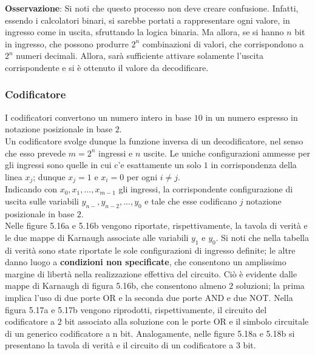 \documentclass[a4paper]{extarticle}
\begin{document}
\vspace{1em}
\noindent
\textbf{Osservazione}: Si noti che questo processo non deve creare confusione. Infatti, essendo i calcolatori binari, si sarebbe portati a rappresentare ogni valore, in ingresso come in uscita, sfruttando la logica binaria. Ma allora, se si hanno \(n\) bit in ingresso, che possono produrre \(2^n\) combinazioni di valori, che corrispondono a \(2^n\) numeri decimali. Allora, sarà sufficiente attivare solamente l'uscita corrispondente e si è ottenuto il valore da decodificare.

\subsubsection{Codificatore}
I codificatori convertono un numero intero in base \(10\) in un numero espresso in notazione posizionale in base \(2\).\\
Un codificatore svolge dunque la funzione inversa di un decodificatore, nel senso che esso prevede \(m = 2^n\) ingressi e \(n\) uscite. Le uniche configurazioni ammesse per gli ingressi sono quelle in cui c’e esattamente un solo \(1\) in corrispondenza della linea \(x_j\); dunque \(x_j = 1\) e \(x_i = 0\) per ogni \(i \neq j\).\\
Indicando con \(x_0, x_1, ..., x_{m - 1}\) gli ingressi, la corrispondente configurazione di uscita sulle variabili \(y_{n - }, y_{n - 2}, ..., y_0\) e tale che esse codificano \(j\) notazione posizionale in base \(2\).\\
Nelle figure 5.16a e 5.16b vengono riportate, rispettivamente, la tavola di verità e le due mappe di Karnaugh associate alle variabili \(y_1\) e \(y_0\). Si noti che nella tabella di verità sono state riportate le sole configurazioni di ingresso definite; le altre danno luogo a \textbf{condizioni non specificate}, che consentono un amplissimo margine di libertà nella realizzazione effettiva del circuito. Ciò è evidente dalle mappe di Karnaugh di figura 5.16b, che consentono almeno \(2\) soluzioni; la prima implica l’uso di due porte OR e la seconda due porte AND e due NOT. Nella figura 5.17a e 5.17b vengono riprodotti, rispettivamente, il circuito del codificatore a \(2\) bit associato alla soluzione con le porte OR e il simbolo circuitale di un generico codificatore a n bit. Analogamente, nelle figure 5.18a e 5.18b si presentano la tavola di verità e il circuito di un codificatore a \(3\) bit.
\end{document}
